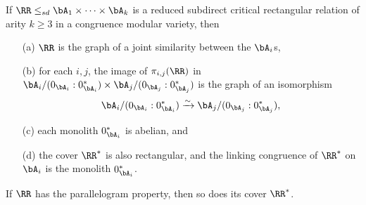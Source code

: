 \begin{thm}\label{rectangular-structure} If $\RR \le_{sd} \bA_1 \times \cdots \times \bA_k$ is a reduced subdirect critical rectangular relation of arity $k \ge 3$ in a congruence modular variety, then
\begin{itemize}
\item[(a)] $\RR$ is the graph of a joint similarity between the $\bA_i$s,

\item[(b)] for each $i,j$, the image of $\pi_{i,j}(\RR)$ in $\bA_i/(0_{\bA_i}:0_{\bA_i}^*) \times \bA_j/(0_{\bA_j}:0_{\bA_j}^*)$ is the graph of an isomorphism
\[
\bA_i/(0_{\bA_i}:0_{\bA_i}^*) \xrightarrow{\sim} \bA_j/(0_{\bA_j}:0_{\bA_j}^*),
\]

\item[(c)] each monolith $0_{\bA_i}^*$ is abelian, and

\item[(d)] the cover $\RR^*$ is also rectangular, and the linking congruence of $\RR^*$ on $\bA_i$ is the monolith $0_{\bA_i}^*$.
\end{itemize}
If $\RR$ has the parallelogram property, then so does its cover $\RR^*$.
\end{thm}
